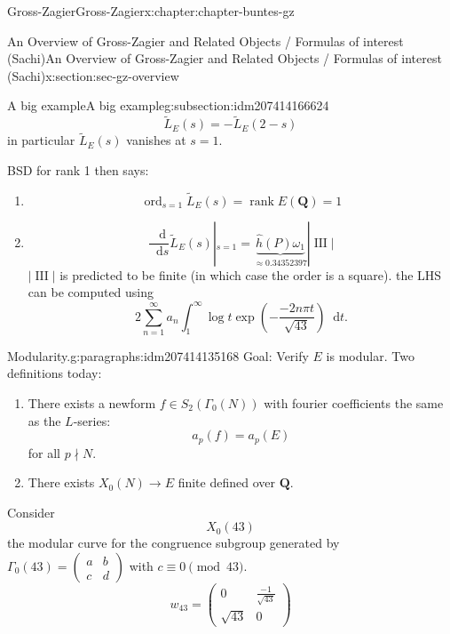 \documentclass[oneside,10pt,]{book}
\numberwithin{equation}{section}
\newcommand{\diff}{\mathop{}\!\mathrm{d}}
\DeclareMathOperator{\Sha}{III}
\newcommand{\QQ}{\mathbf{Q}}
\DeclareMathOperator{\rank}{rank}
\DeclareMathOperator{\ord}{ord}
\newcommand{\amp}{&}
\begin{document}
\begin{chapterptx}{Gross-Zagier}{}{Gross-Zagier}{}{}{x:chapter:chapter-buntes-gz}
\begin{sectionptx}{An Overview of Gross-Zagier and Related Objects \slash{} Formulas of interest (Sachi)}{}{An Overview of Gross-Zagier and Related Objects \slash{} Formulas of interest (Sachi)}{}{}{x:section:sec-gz-overview}
\begin{subsectionptx}{A big example}{}{A big example}{}{}{g:subsection:idm207414166624}
\begin{equation*}
\widetilde L_E(s) = - \widetilde L_E(2-s)
\end{equation*}
in particular \(\widetilde L_E(s)\) vanishes at \(s=1\).%
\par
BSD for rank 1 then says:%
\begin{enumerate}
\item{}%
\begin{equation*}
\ord_{s=1} \widetilde L_E(s) = \rank E(\QQ) = 1
\end{equation*}
%
\item{}%
\begin{equation*}
\frac{\diff}{\diff s} \widetilde L_E(s)|_{s=1} = \underbrace{\hat h ( P) \omega _1}_{\approx 0.34352397} |\Sha|
\end{equation*}
\(|\Sha|\) is predicted to be finite (in which case the order is a square). the LHS can be computed using%
\begin{equation*}
2\sum_{n=1}^\infty  a_n \int_1^\infty  \log t \exp\left(- \frac{-2 n  \pi  t  }{\sqrt{43}}\right) \diff t\text{.}
\end{equation*}
%
\end{enumerate}
%
\begin{paragraphs}{Modularity.}{g:paragraphs:idm207414135168}%
Goal: Verify \(E\) is modular. Two definitions today:%
\begin{enumerate}
\item{}There exists a newform \(f \in S_2(\Gamma _0(N))\) with fourier coefficients the same as the \(L\)-series:%
\begin{equation*}
a_p(f) = a_p(E)
\end{equation*}
for all \(p\nmid N\).%
\item{}There exists \(X_0(N) \to E\) finite defined over \(\QQ\).%
\end{enumerate}
%
\par
Consider%
\begin{equation*}
X_0(43)
\end{equation*}
the modular curve for the congruence subgroup generated by \(\Gamma _0(43) = \begin{pmatrix} a \amp b \\ c \amp d \end{pmatrix}\) with \(c \equiv  0 \pmod{43}\).%
\begin{equation*}
w_{43} =  \begin{pmatrix} 0 \amp \frac{-1}{\sqrt{43}} \\ \sqrt{43} \amp 0\end{pmatrix}

\end{equation*}
\end{paragraphs}
\end{subsectionptx}
\end{sectionptx}
\end{chapterptx}
\end{document}
